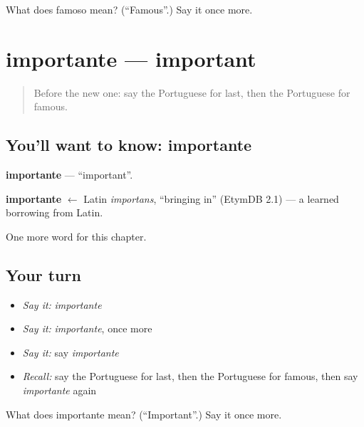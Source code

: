 \begin{tcolorbox}[breakable,colback=teal!4,colframe=teal!35!black,title={Before you move on}]
What does famoso mean? (\textquotedblleft{}Famous\textquotedblright{}.) Say it once more.
\end{tcolorbox}
\section[importante]{importante — important}

\label{lesson:PT-C123-importante}



\begin{quote}
Before the new one: say the Portuguese for last, then the Portuguese for famous.
\end{quote}

\subsection*{You'll want to know: importante}
\textbf{importante} — \textquotedblleft{}important\textquotedblright{}.

\begin{cousinweb}
\textbf{importante} $\leftarrow$ Latin \emph{importans}, \textquotedblleft{}bringing in\textquotedblright{} (EtymDB 2.1) — a learned borrowing from Latin.
\end{cousinweb}

\begin{grammarlens}[title={What you've built}]
One more word for this chapter.
\end{grammarlens}

\subsection*{Your turn}
\begin{itemize}
\raggedright
  \item \emph{Say it:} \emph{importante}
  \item \emph{Say it:} \emph{importante}, once more
  \item \emph{Say it:} say \emph{importante}
  \item \emph{Recall:} say the Portuguese for last, then the Portuguese for famous, then say \emph{importante} again
\end{itemize}

\begin{tcolorbox}[breakable,colback=teal!4,colframe=teal!35!black,title={Before you move on}]
What does importante mean? (\textquotedblleft{}Important\textquotedblright{}.) Say it once more.
\end{tcolorbox}
